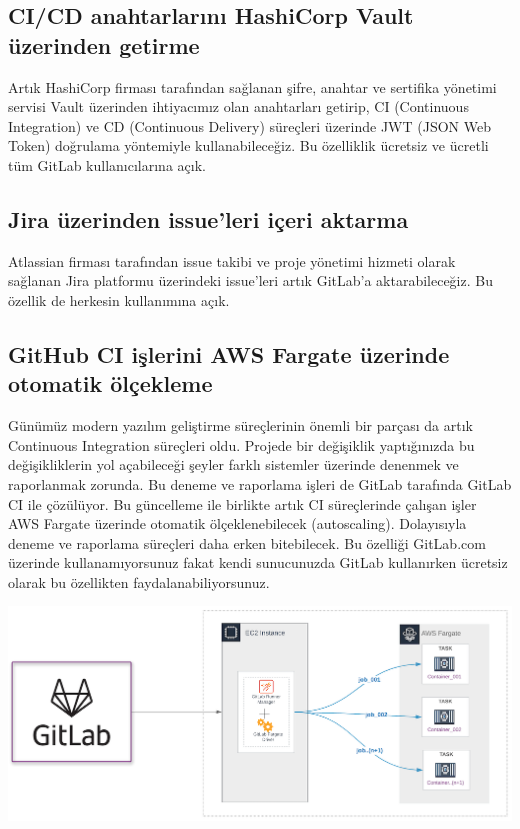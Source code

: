 \documentclass[11pt]{article}
\begin{document}
\subsection{CI/CD anahtarlarını HashiCorp Vault üzerinden getirme}
\label{sec:org42ea832}
Artık HashiCorp firması tarafından sağlanan şifre, anahtar ve sertifika
yönetimi servisi Vault üzerinden ihtiyacımız olan anahtarları getirip, CI
(Continuous Integration) ve CD (Continuous Delivery) süreçleri üzerinde JWT
(JSON Web Token) doğrulama yöntemiyle kullanabileceğiz. Bu özelliklik
ücretsiz ve ücretli tüm GitLab kullanıcılarına açık.
\subsection{Jira üzerinden issue'leri içeri aktarma}
\label{sec:orga1a08a4}
Atlassian firması tarafından issue takibi ve proje yönetimi hizmeti olarak
sağlanan Jira platformu üzerindeki issue'leri artık GitLab'a aktarabileceğiz.
Bu özellik de herkesin kullanımına açık.
\subsection{GitHub CI işlerini AWS Fargate üzerinde otomatik ölçekleme}
\label{sec:orgeb4a695}
Günümüz modern yazılım geliştirme süreçlerinin önemli bir parçası da artık
Continuous Integration süreçleri oldu. Projede bir değişiklik yaptığınızda bu
değişikliklerin yol açabileceği şeyler farklı sistemler üzerinde denenmek ve
raporlanmak zorunda. Bu deneme ve raporlama işleri de GitLab tarafında GitLab
CI ile çözülüyor. Bu güncelleme ile birlikte artık CI süreçlerinde çalışan
işler AWS Fargate üzerinde otomatik ölçeklenebilecek (autoscaling).
Dolayısıyla deneme ve raporlama süreçleri daha erken bitebilecek. Bu özelliği
GitLab.com üzerinde kullanamıyorsunuz fakat kendi sunucunuzda GitLab
kullanırken ücretsiz olarak bu özellikten faydalanabiliyorsunuz.

\begin{center}
\includegraphics[width=.9\linewidth]{gorseller/gitlab-autoscale-aws.png}
\end{center}
\end{document}
